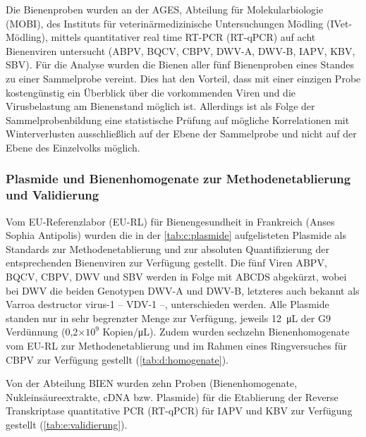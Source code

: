 Die Bienenproben wurden an der AGES, Abteilung für Molekularbiologie (MOBI), des Instituts für veterinärmedizinische Untersuchungen Mödling (IVet-Mödling), mittels quantitativer real time RT-PCR (RT-qPCR) auf acht Bienenviren untersucht (ABPV, BQCV, CBPV, DWV-A, DWV-B, IAPV, KBV, SBV). 
Für die Analyse wurden die Bienen aller fünf Bienenproben eines Standes zu einer Sammelprobe vereint. Dies hat den Vorteil, dass mit einer einzigen Probe kostengünstig ein Überblick über die vorkommenden Viren und die Virusbelastung am Bienenstand möglich ist. Allerdings ist als Folge der Sammelprobenbildung eine statistische Prüfung auf mögliche Korrelationen mit Winterverlusten ausschließlich auf der Ebene der Sammelprobe und nicht auf der Ebene des Einzelvolks möglich.

\subsubsection{Plasmide und Bienenhomogenate zur Methodenetablierung und Validierung} \label{chap:plasmide_homogenate}

Vom EU-Referenzlabor (EU-RL) für Bienengesundheit in Frankreich (Anses Sophia Antipolis) wurden die in der \cref{tab:c:plasmide} aufgelisteten Plasmide als Standards zur Methodenetablierung und zur absoluten Quantifizierung der entsprechenden Bienenviren zur Verfügung gestellt. Die fünf Viren ABPV, BQCV, CBPV, DWV und SBV werden in Folge mit ABCDS abgekürzt, wobei bei DWV die beiden Genotypen DWV-A und DWV-B, letzteres auch bekannt als Varroa destructor virus-1 – VDV-1 –, unterschieden werden. Alle Plasmide standen nur in sehr begrenzter Menge zur Verfügung, jeweils \SI{12}{\micro\liter} der G9 Verdünnung (0,2×$10^9$ Kopien/\si{\micro\liter}). Zudem wurden sechzehn Bienenhomogenate vom EU-RL zur Methodenetablierung und im Rahmen eines Ringversuches für CBPV zur Verfügung gestellt (\cref{tab:d:homogenate}).





Von der Abteilung BIEN wurden zehn Proben (Bienenhomogenate, Nukleinsäureextrakte, cDNA bzw. Plasmide) für die Etablierung der Reverse Transkriptase quantitative PCR (RT-qPCR) für IAPV und KBV zur Verfügung gestellt (\cref{tab:e:validierung}).



